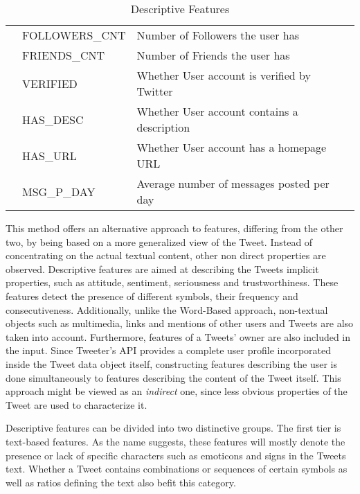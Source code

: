 \begin{table}[h]
\begin{center}
{\begin{tabular}{c |l| l}
						& FOLLOWERS\_CNT 			& Number of Followers the user has	\\
						& FRIENDS\_CNT				& Number of Friends the user has	\\
						& VERIFIED					& Whether User account is verified by Twitter\\
						& HAS\_DESC 				& Whether User account contains a description\\
						& HAS\_URL					& Whether User account has a homepage URL	\\
						& MSG\_P\_DAY 				& Average number of messages posted per day	\\
						\hline\hline
					\end{tabular}
				}	
			\end{center}
			\caption{Descriptive Features}
			\label{table:desc_features}
		\end{table}
	
		\par
		
		This method offers an alternative approach to features, differing from the other two, by being based on a more generalized view of the Tweet. Instead of concentrating on the actual textual content, other non direct properties are observed. Descriptive features are aimed at describing the Tweets implicit properties, such as attitude, sentiment, seriousness and trustworthiness. These features detect the presence of different symbols, their frequency and consecutiveness. Additionally, unlike the Word-Based approach, non-textual objects such as multimedia, links and mentions of other users and Tweets are also taken into account. Furthermore, features of a Tweets' owner are also included in the input. Since Tweeter's API provides a complete user profile incorporated inside the Tweet data object itself, constructing features describing the user is done simultaneously to features describing the content of the Tweet itself. This approach might be viewed as an \textit{indirect} one, since less obvious properties of the Tweet are used to characterize it.
		
		\par
		
		Descriptive features can be divided into two distinctive groups. The first tier is text-based features. As the name suggests, these features will mostly denote the presence or lack of specific characters such as emoticons and signs in the Tweets text. Whether a Tweet contains combinations or sequences of certain symbols as well as ratios defining the text also befit this category.
		
